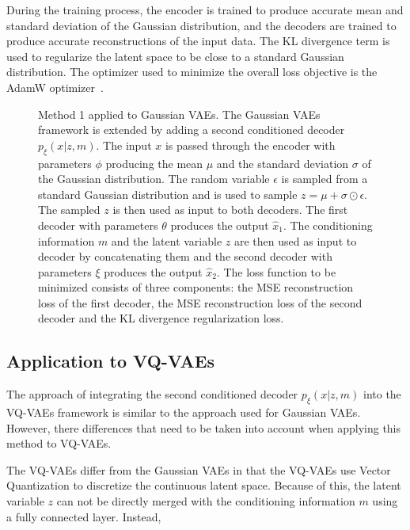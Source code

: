 During the training process, the encoder is trained to produce accurate mean
and standard deviation of the Gaussian distribution, and the decoders are
trained to produce accurate reconstructions of the input data. The KL
divergence term is used to regularize the latent space to be close to a
standard Gaussian distribution. The optimizer used to minimize the overall loss
objective is the AdamW optimizer~\cite{AdamW}.


\begin{figure}[H]
    \centering
    
    \caption[Method 1 applied to Gaussian VAEs.]%
    {
        Method 1 applied to Gaussian VAEs. The Gaussian VAEs framework is extended by adding a second conditioned decoder $p_\xi(x|z,m)$. The input $x$ is passed through the encoder with parameters $\phi$ producing the mean $\mu$ and the standard deviation $\sigma$ of the Gaussian distribution. The random variable $\epsilon$ is sampled from a standard Gaussian distribution and is used to sample $ z = \mu + \sigma \odot \epsilon$. The sampled $z$ is then used as input to both decoders. The first decoder with parameters $\theta$ produces the output $\hat{x}_1$. The conditioning information $m$ and the latent variable $z$ are then used as input to decoder by concatenating them and the second decoder with parameters $\xi$ produces the output $\hat{x}_2$. The loss function to be minimized consists of three components: the MSE reconstruction loss of the first decoder, the MSE reconstruction loss of the second decoder and the KL divergence regularization loss.
    }\label{SCVAE2DFigure}
\end{figure}

\subsection{Application to VQ-VAEs}

The approach of integrating the second conditioned decoder $p_\xi(x|z,m)$ into the VQ-VAEs framework is similar to the approach used for Gaussian VAEs. However, there differences that need to be taken into account when applying this method to VQ-VAEs. 

The VQ-VAEs differ from the Gaussian VAEs in that the VQ-VAEs use Vector Quantization to discretize the continuous latent space. Because of this, the latent variable $z$ can not be directly merged with the conditioning information $m$ using a fully connected layer. Instead, 

